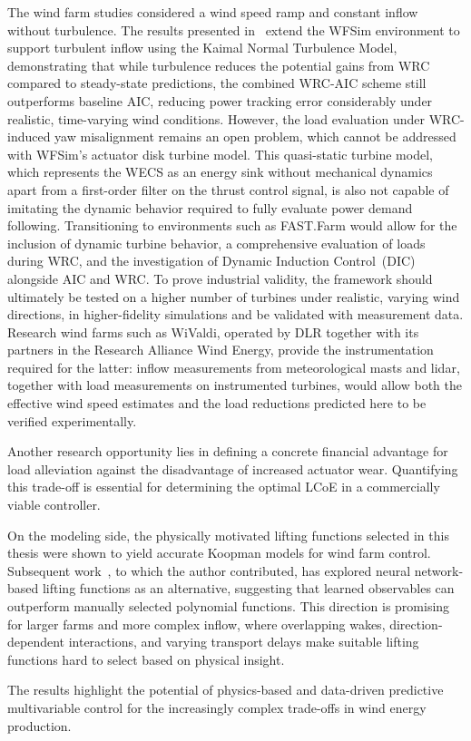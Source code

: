 The wind farm studies considered a wind speed ramp and constant inflow without turbulence. The results 
presented in~\cite{dittmer2026koopman} extend the WFSim environment to support turbulent 
inflow using the Kaimal Normal Turbulence Model, demonstrating that while turbulence reduces 
the potential gains from WRC compared to steady-state predictions, the 
combined WRC-AIC scheme still outperforms baseline AIC, reducing power tracking error 
considerably under realistic, time-varying wind conditions. However, the load evaluation under WRC-induced yaw misalignment remains an open problem, which cannot be addressed with WFSim's actuator disk turbine model. This quasi-static turbine model, which represents the WECS as an energy sink without mechanical dynamics apart from a first-order filter on the thrust control signal, is also not capable of imitating the dynamic behavior required to fully evaluate power demand following. Transitioning to environments such 
as FAST.Farm would allow for the inclusion of dynamic turbine behavior, a comprehensive 
evaluation of loads during WRC, and the investigation of Dynamic Induction Control~(DIC) 
alongside AIC and WRC. To prove industrial validity, the framework should ultimately be 
tested on a higher number of turbines under realistic, varying wind directions, in 
higher-fidelity simulations and be validated with measurement data.
%
Research wind farms such as WiValdi, 
operated by DLR together with its partners in the Research 
Alliance Wind Energy, provide the instrumentation required for 
the latter: inflow measurements from meteorological masts and lidar, together with load 
measurements on instrumented turbines, would allow both the effective wind speed estimates 
and the load reductions predicted here to be verified experimentally.

Another research opportunity lies in defining a concrete financial advantage for load 
alleviation against the disadvantage of increased actuator wear. Quantifying this trade-off 
is essential for determining the optimal LCoE in a commercially viable controller.

On the modeling side, the physically motivated lifting functions selected in this thesis 
were shown to yield accurate Koopman models for wind farm control. Subsequent 
work~\cite{sharan2024autoencoder, sharan2026tcn}, to which the author contributed, has 
explored neural network-based lifting functions as an alternative, suggesting that learned 
observables can outperform manually selected polynomial functions. This direction is promising for larger farms and more complex inflow, where overlapping wakes, direction-dependent interactions, and varying transport delays make suitable lifting functions hard to select based on physical insight.

The results highlight the potential of physics-based and data-driven predictive multivariable control for the increasingly complex trade-offs in wind energy production.